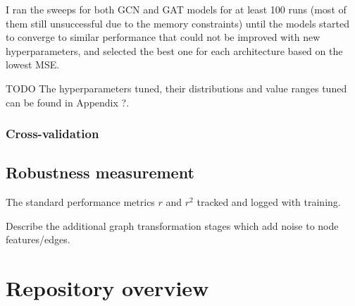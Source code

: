 I ran the sweeps for both GCN and GAT models for at least 100 runs (most of them still unsuccessful due to the memory constraints) until the models started to converge to similar performance that could not be improved with new hyperparameters, and selected the best one for each architecture based on the lowest MSE.

TODO The hyperparameters tuned, their distributions and value ranges tuned can be found in Appendix ?.

\subsubsection{Cross-validation}








\subsection{Robustness measurement}


The standard performance metrics $r$ and $r^2$ tracked and logged with training.

Describe the additional graph transformation stages which add noise to node features/edges.


\section{Repository overview}

